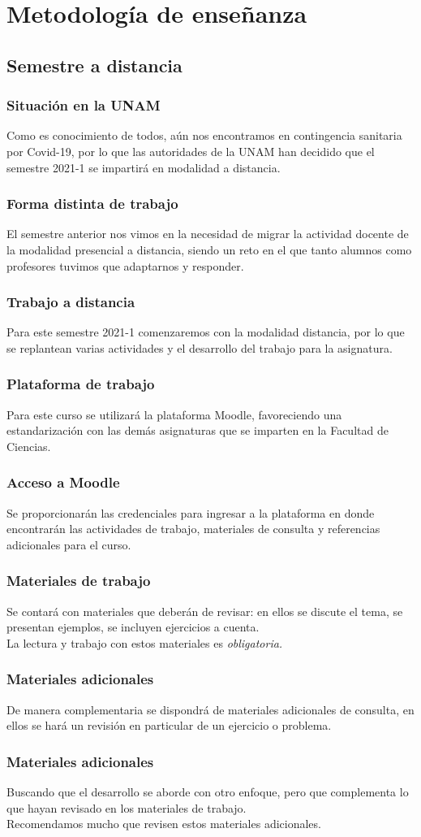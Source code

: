 \section{Metodología de enseñanza}
\subsection{Semestre a distancia}
\begin{frame}
\frametitle{Situación en la UNAM}
Como es conocimiento de todos, aún nos encontramos en contingencia sanitaria por Covid-19, por lo que las autoridades de la UNAM han decidido que el semestre 2021-1 se impartirá en modalidad a distancia.
\end{frame}
\begin{frame}
\frametitle{Forma distinta de trabajo}
El semestre anterior nos vimos en la necesidad de migrar la actividad docente de la modalidad presencial a distancia, siendo un reto en el que tanto alumnos como profesores tuvimos que adaptarnos y responder.
\end{frame}
\begin{frame}
\frametitle{Trabajo a distancia}
Para este semestre 2021-1 comenzaremos con la modalidad distancia, por lo que se replantean varias actividades y el desarrollo del trabajo para la asignatura.
\end{frame}
\begin{frame}
\frametitle{Plataforma de trabajo}
Para este curso se utilizará la plataforma Moodle, favoreciendo una estandarización con las demás asignaturas que se imparten en la Facultad de Ciencias.
\end{frame}
\begin{frame}
\frametitle{Acceso a Moodle}
Se proporcionarán las credenciales para ingresar a la plataforma en donde encontrarán las actividades de trabajo, materiales de consulta y referencias adicionales para el curso.
\end{frame}
\begin{frame}
\frametitle{Materiales de trabajo}
Se contará con materiales que deberán de revisar: en ellos se discute el tema, se presentan ejemplos, se incluyen ejercicios a cuenta.
\\
\bigskip
La lectura y trabajo con estos materiales es \emph{obligatoria.}
\end{frame}
\begin{frame}
\frametitle{Materiales adicionales}
De manera complementaria se dispondrá de materiales adicionales de consulta, en ellos se hará un revisión en particular de un ejercicio o problema.
\end{frame}
\begin{frame}
\frametitle{Materiales adicionales}
Buscando que el desarrollo se aborde con otro enfoque, pero que complementa lo que hayan revisado en los materiales de trabajo.
\\
\bigskip
Recomendamos mucho que revisen estos materiales adicionales.
\end{frame}
